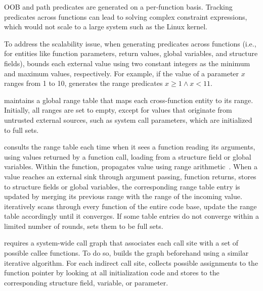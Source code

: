 
OOB and path predicates are generated on a per-function basis.
Tracking predicates across functions can lead to solving complex
constraint expressions, which would not scale to a large system such as the
Linux kernel.

To address the scalability issue, when generating predicates across
functions (i.e., for entities like function parameters, return
values, global variables, and structure fields),
\sys bounds each external value using two constant
integers as the minimum and maximum values, respectively. For example, if the
value of a parameter $x$ ranges from 1 to 10, \sys generates the range predicates
$x \geq 1 \land x < 11$.

\sys maintains a global range table that
maps each cross-function entity to its range. Initially, all
ranges are set to empty, except for values that originate from untrusted
external sources, such as system call parameters, which are initialized to 
full sets.

\sys consults the range table each time when it sees a function reading its arguments,
using values returned by a function call, loading from a structure field or
global variables.  Within the function, \sys propagates value using range
arithmetic~\cite{range-analysis}.  When a value reaches an
external sink through argument passing, function returns, stores to structure
fields or global variables, the corresponding range table entry is updated by
merging its previous range with the range of the incoming value.  \sys
iteratively scans through every function of the entire code base, update the
range table accordingly until it converges.  If some table entries do not
converge within a limited number of rounds, \sys sets them to be full sets.

\sys requires a system-wide call graph that associates each call
site with a set of possible callee functions.  To do so, \sys builds
the graph beforehand using a similar iterative algorithm. For each
indirect call site, \sys collects possible assignments to the
function pointer by looking at all initialization code and stores
to the corresponding structure field, variable, or parameter.

